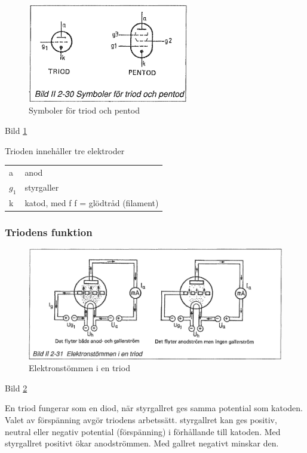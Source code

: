 \begin{figure}[h]
\begin{center}
\includegraphics[width=7cm]{images/bild_2_2-30}
\caption{Symboler för triod och pentod}
\label{fig:BildII2-30}
\end{center}
\end{figure}

Bild \ref{fig:BildII2-30}

Trioden innehåller tre elektroder
\begin{tabular}{ll}
a & anod \\
\(g_1\) & styrgaller \\
k & katod, med f f = glödtråd (filament) \\
\end{tabular}

\subsubsection{Triodens funktion}

\begin{figure}[h]
\begin{center}
\includegraphics[width=14cm]{images/bild_2_2-31}
\caption{Elektronstömmen i en triod}
\label{fig:BildII2-31}
\end{center}
\end{figure}

Bild \ref{fig:BildII2-31}

En triod fungerar som en diod, när styrgallret ges samma potential som katoden.
Valet av förspänning avgör triodens arbetssätt. styrgallret kan ges positiv,
neutral eller negativ potential (förspänning) i förhållande till katoden. Med
styrgallret positivt ökar anodströmmen. Med gallret negativt minskar den.

